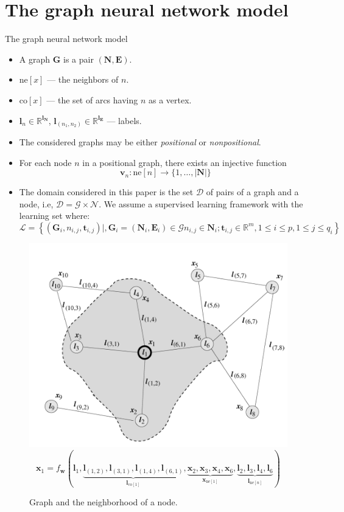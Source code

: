 \documentclass[10pt,aspectratio=169]{beamer}
\begin{document}
\section{The graph neural network model}
\begin{frame}[allowframebreaks]{The graph neural network model}

\begin{itemize}
    \item A graph $\boldsymbol{G}$ is a pair $(\boldsymbol{N}, \boldsymbol{E})$.
    \item $\text{ne}[x]$ --- the neighbors of $n$.
    \item $\text{co}[x]$ --- the set of arcs having $n$ as a vertex.
    \item $\boldsymbol{l}_n \in \mathbb{R} ^ {\boldsymbol{l}_{\boldsymbol{N}}}$, $\boldsymbol{l}_{(n_1, n_2)} \in \mathbb{R} ^ {\boldsymbol{l}_{\boldsymbol{E}}}$ --- labels.
\end{itemize}

\framebreak
\begin{itemize}
    \item The considered graphs may be either \emph{positional} or \emph{nonpositional}.
    \item For each node $n$ in a positional graph, there exists an injective function
    $$\boldsymbol{v}_n : \text{ne}[n] \rightarrow \{1, \ldots, |\boldsymbol{N}|\}$$    
    \item The domain considered in this paper is the set $\mathcal{D}$ of pairs of a graph and a node, i.e, $\mathcal{D} = \mathcal{G} \times \mathcal{N}$.
    We assume a supervised learning framework with the learning set
    where:
    $$
    \mathcal{L}=\left\{\left(\boldsymbol{G}_{i}, n_{i, j}, \boldsymbol{t}_{i, j}\right) \mid, \boldsymbol{G}_{i}=\left(\boldsymbol{N}_{i}, \boldsymbol{E}_{i}\right) \in \mathcal{G} 
    n_{i, j} \in \boldsymbol{N}_{i} ; \boldsymbol{t}_{i, j} \in \mathbb{R}^{m}, 1 \leq i \leq p, 1 \leq j \leq q_{i}\right\}
    $$    
\end{itemize}

\begin{figure}
    \includegraphics[width=.34\textwidth]{pic/graph.png}
    $$\boldsymbol{x}_{1}=f_{\boldsymbol{w}}(\boldsymbol{l}_{1}, \underbrace{\boldsymbol{l}_{(1,2)}, \boldsymbol{l}_{(3,1)}, \boldsymbol{l}_{(1,4)}, \boldsymbol{l}_{(6,1)}}_{\boldsymbol{l}_{\text{co}[1]}}, \underbrace{\boldsymbol{x}_{2}, \boldsymbol{x}_{3}, \boldsymbol{x}_{4}, \boldsymbol{x}_{6}}_{\boldsymbol{x}_{\text{ne}[1]}}, \underbrace{\boldsymbol{l}_{2}, \boldsymbol{l}_{3}, \boldsymbol{l}_{4}, \boldsymbol{l}_{6}}_{\boldsymbol{l}_{\text{ne}[n]}})$$
    \caption{Graph and the neighborhood of a node.}
\end{figure}

\end{frame}
\end{document}

